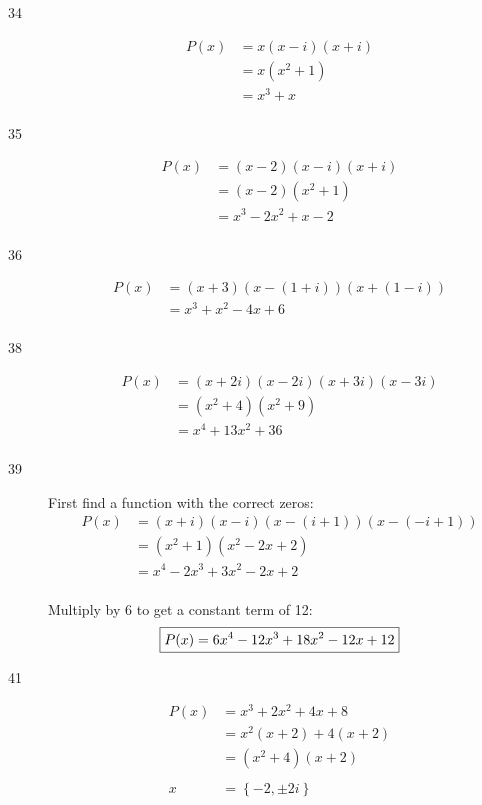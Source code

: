 \documentclass{exam}
\begin{document}
\begin{description}
      \item[34]
        \begin{align*}
          P(x) &= x (x - i) (x + i) \\
               &= x (x^2 + 1) \\
               &= \boxed{x^3 + x} \\
        \end{align*}

      \item[35]
        \begin{align*}
          P(x) &= (x - 2) (x - i) (x + i) \\
               &= (x - 2) (x^2 + 1) \\
               &= \boxed{x^3 - 2x^2 + x - 2} \\
        \end{align*}

      \item[36]
        \begin{align*}
          P(x) &= (x + 3) (x - (1 + i)) (x + (1 - i)) \\
               &= \boxed{x^3 + x^2 - 4x + 6} \\
        \end{align*}

      \item[38]
        \begin{align*}
          P(x) &= (x + 2i)(x - 2i)(x + 3i)(x - 3i) \\
               &= (x^2 + 4)(x^2 + 9) \\
               &= \boxed{x^4 + 13x^2 + 36} \\
        \end{align*}

      \item[39]
        First find a function with the correct zeros:
        \begin{align*}
          P(x) &= (x + i) (x - i) (x - (i + 1)) (x - (-i + 1)) \\
               &= (x^2 + 1)(x^2 - 2x + 2) \\
               &= x^4 - 2x^3 + 3x^2 - 2x + 2 \\
        \end{align*}

        Multiply by 6 to get a constant term of 12:
        \[
           \boxed{P(x) = 6x^4 - 12x^3 + 18x^2 - 12x + 12} \\
        \]
      \item[41]
        \begin{align*}
          P(x) &= x^3 + 2x^2 + 4x + 8 \\
               &= x^2(x + 2) + 4(x + 2) \\
               &= (x^2 + 4)(x + 2) \\
               \\
          x    &= \boxed{\left\{ -2, \pm 2i \right\}} \\
        \end{align*}


\end{description}
\end{document}
